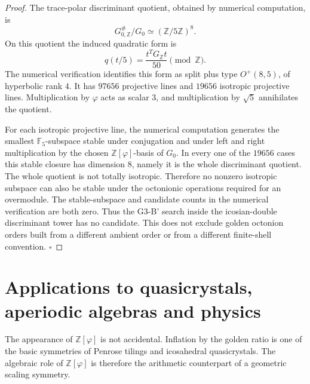 \documentclass[12pt,oneside,english]{amsart}
\numberwithin{equation}{section}
\numberwithin{figure}{section}
\numberwithin{table}{section}
\theoremstyle{plain}
\theoremstyle{definition}
\theoremstyle{remark}
\newcommand{\ZZ}{\mathbb Z}
\newcommand{\Zphi}{\mathbb Z[\varphi]}
\begin{document}
\begin{proof}
The trace-polar discriminant quotient, obtained by numerical computation, is
\begin{equation}
G_{0,\ZZ}^{\#}/G_0\simeq(\ZZ/5\ZZ)^8.
\label{eq:g0-trace-discriminant}
\end{equation}
On this quotient the induced quadratic form is
\begin{equation}
q(t/5)=\frac{t^T G_{\ZZ}t}{50}\pmod{\ZZ}.
\label{eq:g0-discriminant-quadratic-form}
\end{equation}
The numerical verification identifies this form as split plus type \(O^+(8,5)\), of hyperbolic rank \(4\). It has \(97656\) projective lines and \(19656\) isotropic projective lines. Multiplication by \(\varphi\) acts as scalar \(3\), and multiplication by \(\sqrt5\) annihilates the quotient.

For each isotropic projective line, the numerical computation generates the smallest \(\mathbb F_5\)-subspace stable under conjugation and under left and right multiplication by the chosen \(\Zphi\)-basis of \(G_0\). In every one of the \(19656\) cases this stable closure has dimension \(8\), namely it is the whole discriminant quotient. The whole quotient is not totally isotropic. Therefore no nonzero isotropic subspace can also be stable under the octonionic operations required for an overmodule. The stable-subspace and candidate counts in the numerical verification are both zero.
Thus the G3-B' search inside the icosian-double discriminant tower has no candidate. This does not exclude golden octonion orders built from a different ambient order or from a different finite-shell convention. \(\square\)
\end{proof}

\section{Applications to quasicrystals, aperiodic algebras and physics}
\label{sec:applications}

The appearance of \(\Zphi\) is not accidental. Inflation by the golden ratio is one of the basic symmetries of Penrose tilings and icosahedral quasicrystals. The algebraic role of \(\Zphi\) is therefore the arithmetic counterpart of a geometric scaling symmetry.
\end{document}
